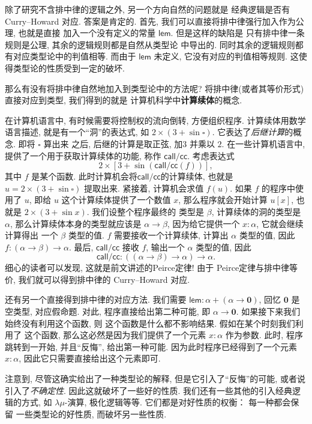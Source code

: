 \documentclass[UTF8]{ctexbook}
\newcommand{\cons}[1]{\textsf{#1}}
\theoremstyle{plain}
\theoremstyle{definition}
\theoremstyle{remark}
\begin{document}
除了研究不含排中律的逻辑之外, 另一个方向自然的问题就是
经典逻辑是否有 Curry--Howard 对应. 答案是肯定的.
首先, 我们可以直接将排中律强行加入作为公理, 也就是直接
加入一个没有定义的常量 \(\cons{lem}\). 但是这样的缺陷是
只有排中律一条规则是公理, 其余的逻辑规则都是自然从类型论
中导出的. 同时其余的逻辑规则都有对应类型论中的判值相等.
而由于 \(\cons{lem}\) 未定义, 它没有对应的判值相等规则.
这使得类型论的性质受到一定的破坏.

那么有没有将排中律自然地加入到类型论中的方法呢?
将排中律(或者其等价形式)直接对应到类型, 我们得到的就是
计算机科学中\textbf{计算续体}的概念.

在计算机语言中,
有时候需要将控制权的流向倒转, 方便组织程序.
计算续体用数学语言描述, 就是有一个“洞”的表达式,
如 \(2 \times (3 + \sin \square)\).
它表达了\emph{后继计算}的概念. 即将 \(\square\) 算出来
之后, 后继的计算是取正弦, 加\(3\) 并乘以 \(2\).
在一些计算机语言中, 提供了一个用于获取计算续体的功能,
称作 \(\cons{call/cc}\). 考虑表达式
\[2 \times [3 + \sin(\cons{call/cc}(f))],\]
其中 \(f\) 是某个函数.
此时计算机会将\(\cons{call/cc}\)的计算续体, 也就是
\(u = 2 \times (3 + \sin \square)\) 提取出来.
紧接着, 计算机会求值 \(f(u)\).
如果 \(f\) 的程序中使用了 \(u\), 即给
\(u\) 这个计算续体提供了一个数值 \(x\),
那么程序就会开始计算 \(u[x]\), 也就是
\(2 \times (3 + \sin x)\). 我们设整个程序最终的
类型是 \(\beta\), 计算续体的洞的类型是 \(\alpha\),
那么计算续体本身的类型就应该是 \(\alpha \to \beta\),
因为给它提供一个 \(x : \alpha\), 它就会继续计算得出
一个 \(\beta\) 类型的值. \(f\) 需要接收一个计算续体,
计算出 \(\alpha\) 类型的值, 因此
\(f : (\alpha \to \beta) \to\alpha\). 最后,
\(\cons{call/cc}\) 接收 \(f\), 输出一个 \(\alpha\)
类型的值, 因此
\[\cons{call/cc} : ((\alpha \to \beta)\to\alpha)\to\alpha.\]
细心的读者可以发现, 这就是前文讲述的Peirce定律! 由于
Peirce定律与排中律等价, 我们就可以得到排中律的
Curry--Howard 对应.

还有另一个直接得到排中律的对应方法. 我们需要
\(\cons{lem} : \alpha + (\alpha \to \mathbf 0)\),
回忆 \(\mathbf 0\) 是空类型, 对应假命题.
对此, 程序直接给出第二种可能, 即 \(\alpha \to \mathbf 0\).
如果接下来我们始终没有利用这个函数, 则
这个函数是什么都不影响结果. 假如在某个时刻我们利用了
这个函数, 那么这必然是因为我们提供了一个元素 \(x : \alpha\)
作为参数. 此时, 程序跳转到一开始, 并且“反悔”,
给出第一种可能. 因为此时程序已经得到了一个元素 \(x : \alpha\),
因此它只需要直接给出这个元素即可.

注意到, 尽管这确实给出了一种类型论的解释, 但是它引入了“反悔”的可能,
或者说引入了\emph{不确定性}. 因此这就破坏了一些好的性质.
我们还有一些其他的引入经典逻辑的方式, 如 \(\lambda\mu\)-演算,
极化逻辑等等. 它们都是对好性质的权衡： 每一种都会保留
一些类型论的好性质, 而破坏另一些性质.
\end{document}

